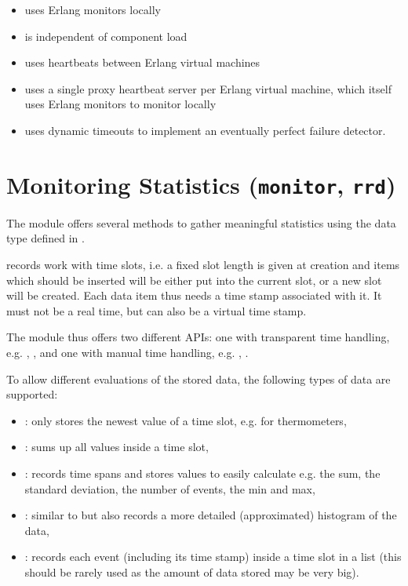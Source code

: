 \begin{itemize}
\item uses Erlang monitors locally
\item is independent of component load
\item uses heartbeats between Erlang virtual machines
\item uses a single proxy heartbeat server per Erlang virtual machine, which
  itself uses Erlang monitors to monitor locally
\item uses dynamic timeouts to implement an eventually perfect failure detector.
\end{itemize}

\section{Monitoring Statistics (\texttt{monitor}, \texttt{rrd})}

The  module offers several methods to gather meaningful
statistics using the  data type defined in .

 records work with time slots, i.e. a fixed slot length is given
at creation and items which should be inserted will be either put into the
current slot, or a new slot will be created.
Each data item thus needs a time stamp associated with it. It must not be a
real time, but can also be a virtual time stamp.

The  module thus offers two different APIs:
one with transparent time handling, e.g.
 , , and
one with manual time handling, e.g.
 , .

To allow different evaluations of the stored data, the following types of data
are supported:
\begin{itemize}
  \item {}: only stores the newest value of a time slot, e.g. for thermometers,
  \item {}: sums up all values inside a time slot,
  \item {}: records time spans and stores values to easily calculate e.g. the sum, the
  standard deviation, the number of events, the min and max,
  \item {}: similar to  but also records a more detailed
  (approximated) histogram of the data,
  \item {}: records each event (including its time stamp) inside a time slot in a list
  (this should be rarely used as the amount of data stored may be very big).
\end{itemize}

